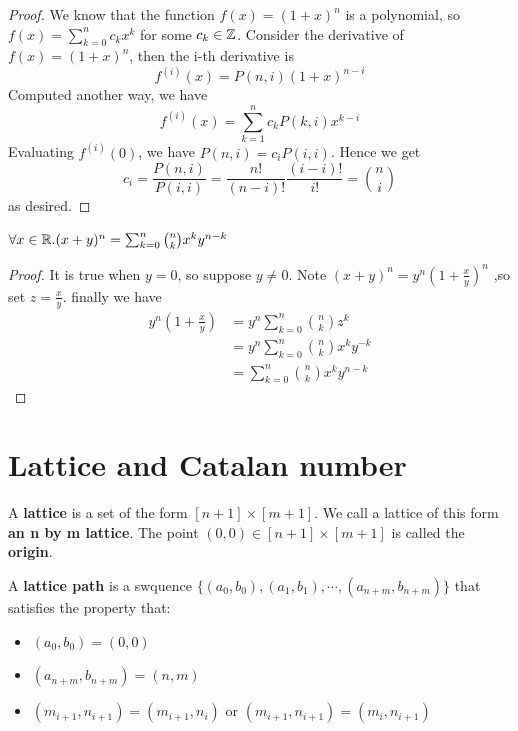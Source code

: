 \begin{proof}
    We know that the function $f(x)=(1+x)^n$ is a polynomial, 
    so $f(x)=\sum_{k=0}^{n}c_kx^k$ for some $c_k \in \mathbb{Z}$. 
    Consider the derivative of $f(x)=(1+x)^n$, then the i-th derivative is $$f^{(i)}(x)=P(n,i)(1+x)^{n-i}$$ 
    Computed another way, we have $$f^{(i)}(x)=\sum_{k=1}^{n}c_kP(k,i)x^{k-i}$$
    Evaluating $f^{(i)}(0)$, we have $P(n,i)=c_iP(i,i)$. 
    Hence we get $$c_i=\frac{P(n,i)}{P(i,i)}=\frac{n!}{(n-i)!}\frac{(i-i)!}{i!}={n \choose i}$$ as desired.
\end{proof}

\begin{theorem}
    $\forall x \in \mathbb{R}. (x+y)^n=\sum_{k=0}^{n}{n \choose k}x^ky^{n-k}$
\end{theorem}
\begin{proof}
    It is true when $y=0$, so suppose $y \neq 0$. 
    Note $(x+y)^n=y^n(1+\frac{x}{y})^n$ ,so set $z=\frac{x}{y}$. 
    finally we have 
    \begin{equation}
        \begin{split}
            y^n(1+\frac{x}{y}) &= y^n \sum_{k=0}^{n}{n \choose k}z^k\\
            &= y^n \sum_{k=0}^{n}{n \choose k}x^ky^{-k}\\
            &= \sum_{k=0}^n{n \choose k}x^ky^{n-k}
        \end{split}
    \end{equation}
\end{proof}

\section{Lattice and Catalan number}

\begin{definition}
    A \textbf{lattice} is a set of the form $[n+1] \times [m+1]$. 
    We call a lattice of this form \textbf{an n by m lattice}. 
    The point $(0,0) \in [n+1]\times [m+1]$ is called the  \textbf{origin}.
\end{definition}

\begin{definition}
    A \textbf{lattice path} is a swquence $\{(a_0,b_0),(a_1,b_1), \cdots ,(a_{n+m},b_{n+m})\}$ 
    that satisfies the property that:\\
    \begin{itemize}
        \item $(a_0,b_0)=(0,0)$
        \item $(a_{n+m},b_{n+m})=(n,m)$
        \item $(m_{i+1},n_{i+1})=(m_{i+1},n_i)$ or $(m_{i+1},n_{i+1})=(m_{i},n_{i+1})$
    \end{itemize}
\end{definition}

